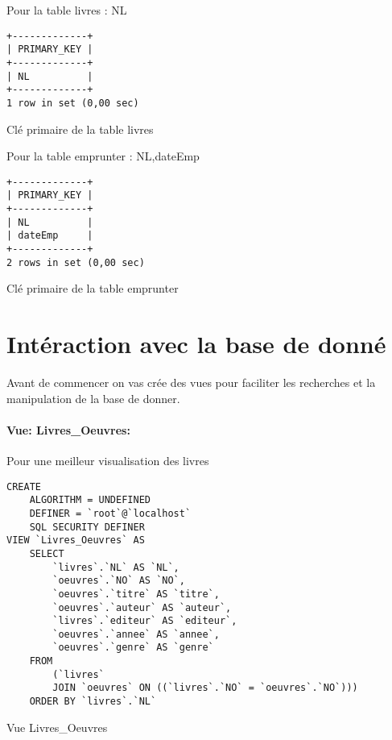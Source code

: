\documentclass{article}
\begin{document}
\begin{center}
\begin{minipage}{0.5\linewidth}
Pour la table livres : NL
\begin{listing}[H]
\begin{verbatim}
+-------------+
| PRIMARY_KEY |
+-------------+
| NL          |
+-------------+
1 row in set (0,00 sec)
\end{verbatim}
	\caption{Clé primaire de la table livres}
\end{listing}
\end{minipage}

\vspace*{20pt}
\begin{minipage}{0.5\linewidth}
Pour la table emprunter : NL,dateEmp
\begin{listing}[H]
\begin{verbatim}
+-------------+
| PRIMARY_KEY |
+-------------+
| NL          |
| dateEmp     |
+-------------+
2 rows in set (0,00 sec)
\end{verbatim}
	\caption{Clé primaire de la table emprunter}
\end{listing}
\end{minipage}
\end{center}
\newpage

\section{Intéraction avec la base de donné}

Avant de commencer on vas crée des vues pour faciliter les recherches et la manipulation de la base de donner.


\paragraph{Vue: Livres\_Oeuvres: } Pour une meilleur visualisation des livres
\begin{listing}[H]
\begin{verbatim}
CREATE 
    ALGORITHM = UNDEFINED 
    DEFINER = `root`@`localhost` 
    SQL SECURITY DEFINER
VIEW `Livres_Oeuvres` AS
    SELECT 
        `livres`.`NL` AS `NL`,
        `oeuvres`.`NO` AS `NO`,
        `oeuvres`.`titre` AS `titre`,
        `oeuvres`.`auteur` AS `auteur`,
        `livres`.`editeur` AS `editeur`,
        `oeuvres`.`annee` AS `annee`,
        `oeuvres`.`genre` AS `genre`
    FROM
        (`livres`
        JOIN `oeuvres` ON ((`livres`.`NO` = `oeuvres`.`NO`)))
    ORDER BY `livres`.`NL`
\end{verbatim}
	\caption{Vue Livres\_Oeuvres}
\end{listing}
\end{document}
